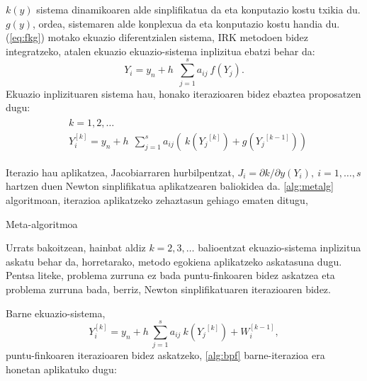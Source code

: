 $k(y)$ sistema dinamikoaren alde sinplifikatua da eta konputazio kostu txikia du. $g(y)$, ordea, sistemaren alde konplexua da eta konputazio kostu handia du. (\ref{eq:fkg}) motako ekuazio diferentzialen sistema, IRK metodoen bidez integratzeko, atalen ekuazio ekuazio-sistema inplizitua ebatzi behar da: 
\begin{equation*}
Y_i=y_n+h\ \ \sum^s_{j=1}{a_{ij} \ f({Y_j}) }. 
\end{equation*} 
%
Ekuazio inplizituaren sistema hau, honako iterazioaren bidez ebaztea proposatzen dugu:
\begin{align}
\begin{split}
&k=1,2,\dots \\
&Y_i^{[k]}=y_n+h\ \ \sum^s_{j=1}{a_{ij}(\ k({Y_j}^{[k]})+g({Y_j}^{[k-1]})) }
\end{split}
\end{align}

Iterazio hau aplikatzea, Jacobiarraren hurbilpentzat, $J_i=\partial k/ \partial y (Y_i), \ i=1,\dots,s$ hartzen duen Newton sinplifikatua aplikatzearen baliokidea da. \ref{alg:metalg} algoritmoan, iterazioa aplikatzeko zehaztasun gehiago ematen ditugu,
 
\begin{algorithm}[H]
 \caption{Meta-algoritmoa}
 \label{alg:metalg}
\end{algorithm}

Urrats bakoitzean, hainbat aldiz $k=2,3,\dots$ balioentzat ekuazio-sistema inplizitua askatu behar da, horretarako, 
metodo egokiena aplikatzeko askatasuna dugu. Pentsa liteke,  problema zurruna ez bada puntu-finkoaren bidez askatzea eta problema zurruna bada, berriz,  Newton sinplifikatuaren iterazioaren bidez.

Barne ekuazio-sistema,
\begin{equation*}
 Y_i^{[k]}=y_n+h\  \sum^s_{j=1}{a_{ij}\ k({Y_j}^{[k]})+W^{[k-1]}_i},
\end{equation*}
puntu-finkoaren iterazioaren bidez askatzeko, \ref{alg:bpf} barne-iterazioa era honetan aplikatuko dugu: 

